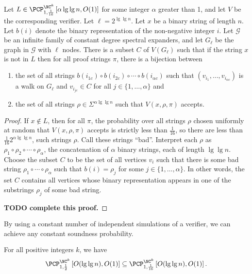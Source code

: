 \documentclass[]{article}
\newcommand{\PCPcs}[5]{\PCP^{#1}_{#2, #3}\left[#4, #5\right]}
\begin{document}
\begin{lemma}\label{lem:badsubset}
  Let $L \in \PCPcs{\NC^k}{1}{\frac{1}{16}}{\alpha \lg \lg n}{O(1)}$ for some integer $\alpha$ greater than 1, and let $V$ be the corresponding \PCP{} verifier.
  Let $\ell = 2^{\lg \lg n}$.
  Let $x$ be a binary string of length $n$.
  Let $b(i)$ denote the binary representation of the non-negative integer $i$.
  Let $\mathcal{G}$ be an infinite family of constant degree spectral expanders, and let $G_\ell$ be the graph in $\mathcal{G}$ with $\ell$ nodes.
  There is a subset $C$ of $V(G_\ell)$ such that if the string $x$ is not in $L$ then for all proof strings $\pi$, there is a bijection between
  \begin{enumerate}
  \item the set of all strings $b(i_{1c}) \circ b(i_{2c}) \circ \dotsb \circ b(i_{\alpha c})$ such that $(v_{i_1}, \dotsc, v_{i_{\alpha c}})$ is a walk on $G_\ell$ and $v_{i_{jc}} \in C$ for all $j \in \{1, \dotsc, \alpha\}$ and
  \item the set of all strings $\rho \in \Sigma^{\alpha \lg \lg n}$ such that $V(x, \rho, \pi)$ accepts.
  \end{enumerate}
\end{lemma}
\begin{proof}
  If $x \notin L$, then for all $\pi$, the probability over all strings $\rho$ chosen uniformly at random that $V(x, \rho, \pi)$ accepts is strictly less than $\frac{1}{16}$, so there are less than $\frac{1}{16} 2^{\alpha \lg \lg n}$, such strings $\rho$.
  Call these strings ``bad''.
  Interpret each $\rho$ as $\rho_1 \circ \rho_2 \circ \dotsb \circ \rho_\alpha$, the concatenation of $\alpha$ binary strings, each of length $\lg \lg n$.
  Choose the subset $C$ to be the set of all vertices $v_i$ such that there is some bad string $\rho_1 \circ \dotsb \circ \rho_\alpha$ such that $b(i) = \rho_j$ for some $j \in \{1, \dotsc, \alpha\}$.
  In other words, the set $C$ contains all vertices whose binary representation appears in one of the substrings $\rho_j$ of some bad string.

  \textbf{TODO complete this proof.}
\end{proof}

By using a constant number of independent simulations of a \PCP{} verifier, we can achieve any constant soundness probability.

\begin{lemma}\label{lem:16}
  For all positive integers $k$, we have
  \begin{equation*}
    \PCPcs{\NC^k}{1}{\frac{1}{2}}{O(\lg \lg n)}{O(1)}
    \subseteq
    \PCPcs{\NC^k}{1}{\frac{1}{16}}{O(\lg \lg n)}{O(1)}.
  \end{equation*}
\end{lemma}
\end{document}
